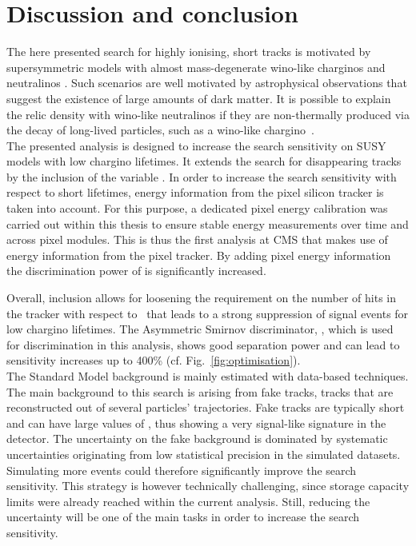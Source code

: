 \clearpage
\FloatBarrier
\chapter{Discussion and conclusion}
\label{sec:Discussion}

The here presented search for highly ionising, short tracks is motivated by supersymmetric models with almost mass-degenerate wino-like charginos \chipm and neutralinos \chiO.
Such scenarios are well motivated by astrophysical observations that suggest the existence of large amounts of dark matter.
It is possible to explain the relic density with wino-like neutralinos if they are non-thermally produced via the decay of long-lived particles, such as a wino-like chargino~\cite{bib:Moroi:DarkMatter_2013}.\\

The presented analysis is designed to increase the search sensitivity on SUSY models with low chargino lifetimes.
It extends the search for disappearing tracks~\cite{bib:CMS:DT_8TeV} by the inclusion of the variable \dedx.
In order to increase the search sensitivity with respect to short lifetimes, energy information from the pixel silicon tracker is taken into account.
For this purpose, a dedicated pixel energy calibration was carried out within this thesis to ensure stable energy measurements over time and across pixel modules.
This is thus the first analysis at CMS that makes use of energy information from the pixel tracker.
By adding pixel energy information the discrimination power of \dedx is significantly increased.

Overall, \dedx inclusion allows for loosening the requirement on the number of hits in the tracker with respect to~\cite{bib:CMS:DT_8TeV} that leads to a strong suppression of signal events for low chargino lifetimes. 
The Asymmetric Smirnov discriminator, \ias, which is used for \dedx discrimination in this analysis, shows good separation power and can lead to sensitivity increases up to 400\% (cf. Fig.~\ref{fig:optimisation}).\\


The Standard Model background is mainly estimated with data-based techniques.
The main background to this search is arising from fake tracks, \ie tracks that are reconstructed out of several particles' trajectories.
Fake tracks are typically short and can have large values of \ias, thus showing a very signal-like signature in the detector.
The uncertainty on the fake background is dominated by systematic uncertainties originating from low statistical precision in the simulated datasets.
Simulating more events could therefore significantly improve the search sensitivity.
This strategy is however technically challenging, since storage capacity limits were already reached within the current analysis.
Still, reducing the uncertainty will be one of the main tasks in order to increase the search sensitivity.

